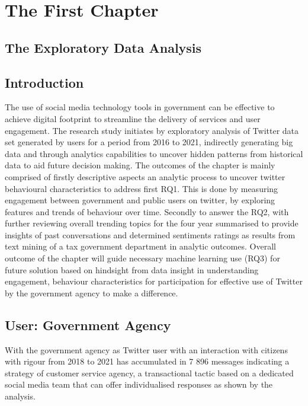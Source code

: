 \chapter{The First Chapter}
\label{chap:first}

\section{The Exploratory Data Analysis}

\section{Introduction}

The use of social media technology tools in government can be effective to  achieve digital footprint to streamline the delivery of services and user engagement.  The research study initiates by exploratory analysis of Twitter data set generated by users for a period from 2016 to 2021, indirectly generating big data and through analytics capabilities to uncover hidden patterns from historical data to aid future decision making.   The outcomes of the chapter is mainly comprised of firstly descriptive aspects an analytic process to uncover twitter behavioural characteristics to address first RQ1. This is done by measuring engagement between government and public users on twitter, by exploring features and trends of behaviour over time.  Secondly to answer the RQ2, with further reviewing overall trending topics for the four year summarised to provide insights of past conversations and determined sentiments ratings as results from text mining of a tax government department in analytic outcomes.  Overall outcome of the chapter will guide necessary machine learning use (RQ3) for future solution based on hindsight from data insight in understanding engagement, behaviour characteristics for participation for effective use of Twitter by the government agency to make a difference.\\

\section{User: Government Agency}

With the government agency as Twitter user with an interaction with citizens with rigour from 2018 to 2021 has accumulated in 7 896 messages indicating a strategy of customer service agency, a transactional tactic based on a dedicated social media team that can offer individualised responses as shown by the analysis.


